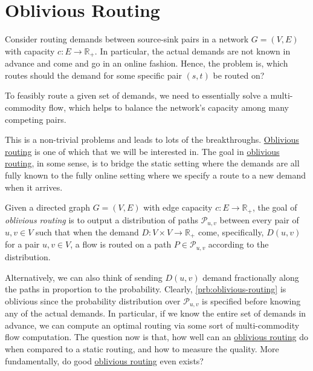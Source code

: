 \section{Oblivious Routing}
Consider routing demands between source-sink pairs in a network \(G = (V, E)\) with capacity \(c \colon E\to \mathbb{R} _+\). In particular, the actual demands are not known in advance and come and go in an online fashion. Hence, the problem is, which routes should the demand for some specific pair \((s, t)\) be routed on?

\begin{intuition}
	To feasibly route a given set of demands, we need to essentially solve a multi-commodity flow, which helps to balance the network's capacity among many competing pairs.
\end{intuition}

This is a non-trivial problems and leads to lots of the breakthroughs. \hyperref[prb:oblivious-routing]{Oblivious routing} is one of which that we will be interested in. The goal in \hyperref[prb:oblivious-routing]{oblivious routing}, in some sense, is to bridge the static setting where the demands are all fully known to the fully online setting where we specify a route to a new demand when it arrives.

\begin{problem}\label{prb:oblivious-routing}
Given a directed graph \(G = (V, E)\) with edge capacity \(c \colon E \to \mathbb{R} _+\), the goal of \emph{oblivious routing} is to output a distribution of paths \(\mathcal{P} _{u, v}\)  between every pair of \(u, v \in V\) such that when the demand \(D \colon V \times V \to \mathbb{R} _+\) come, specifically, \(D(u, v)\) for a pair \(u, v \in V\), a flow is routed on a path \(P \in \mathcal{P} _{u, v}\) according to the distribution.
\end{problem}

Alternatively, we can also think of sending \(D(u, v)\) demand fractionally along the paths in proportion to the probability. Clearly, \autoref{prb:oblivious-routing} is oblivious since the probability distribution over \(\mathcal{P} _{u, v}\) is specified before knowing any of the actual demands. In particular, if we know the entire set of demands in advance, we can compute an optimal routing via some sort of multi-commodity flow computation. The question now is that, how well can an \hyperref[prb:oblivious-routing]{oblivious routing} do when compared to a static routing, and how to measure the quality. More fundamentally, do good \hyperref[prb:oblivious-routing]{oblivious routing} even exists?

